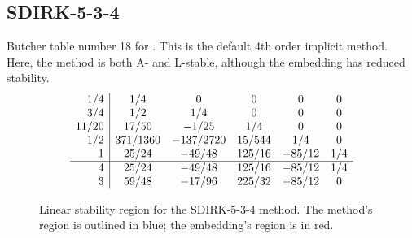 \documentclass[letterpaper,10pt,english]{sphinxmanual}
\begin{document}
\subsection{SDIRK-5-3-4}
\label{Butcher:butcher-sdirk-5-4}\label{Butcher:sdirk-5-3-4}
Butcher table number 18
for {\hyperref[c_interface/User_callable:c.ARKodeSetIRKTableNum]{\emph{}}}.  This is
the default 4th order implicit method.  Here, the method is both A-
and L-stable, although the embedding has reduced stability.
\begin{gather}
\begin{split}\begin{array}{r|ccccc}
  1/4 & 1/4 & 0 & 0 & 0 & 0 \\
  3/4 & 1/2 & 1/4 & 0 & 0 & 0 \\
  11/20 & 17/50 & -1/25 & 1/4 & 0 & 0 \\
  1/2 & 371/1360 & -137/2720 & 15/544 & 1/4 & 0 \\
  1 & 25/24 & -49/48 & 125/16 & -85/12 & 1/4 \\
  \hline
  4 & 25/24 & -49/48 & 125/16 & -85/12 & 1/4 \\
  3 & 59/48 & -17/96 & 225/32 & -85/12 & 0
\end{array}\end{split}\notag
\end{gather}\begin{figure}[htbp]
\centering
\capstart

\caption{Linear stability region for the SDIRK-5-3-4 method.  The method's
region is outlined in blue; the embedding's region is in red.}\end{figure}
\end{document}
